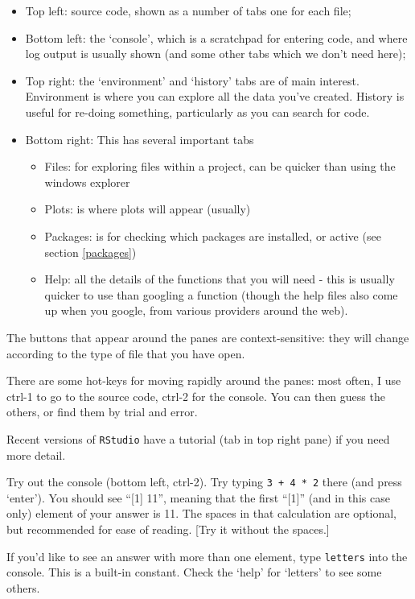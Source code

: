 \documentclass[
]{book}
\providecommand{\tightlist}{%
  \setlength{\itemsep}{0pt}\setlength{\parskip}{0pt}}
\begin{document}
\begin{itemize}
\tightlist
\item
  Top left: source code, shown as a number of tabs one for each file;
\item
  Bottom left: the `console', which is a scratchpad for entering code, and where log output is usually shown (and some other tabs which we don't need here);
\item
  Top right: the `environment' and `history' tabs are of main interest. Environment is where you can explore all the data you've created. History is useful for re-doing something, particularly as you can search for code.
\item
  Bottom right: This has several important tabs

  \begin{itemize}
  \tightlist
  \item
    Files: for exploring files within a project, can be quicker than using the windows explorer
  \item
    Plots: is where plots will appear (usually)
  \item
    Packages: is for checking which packages are installed, or active (see section \ref{packages})
  \item
    Help: all the details of the functions that you will need - this is usually quicker to use than googling a function (though the help files also come up when you google, from various providers around the web).
  \end{itemize}
\end{itemize}

The buttons that appear around the panes are context-sensitive: they will change according to the type of file that you have open.

There are some hot-keys for moving rapidly around the panes: most often, I use ctrl-1 to go to the source code, ctrl-2 for the console. You can then guess the others, or find them by trial and error.

Recent versions of \texttt{RStudio} have a tutorial (tab in top right pane) if you need more detail.

Try out the console (bottom left, ctrl-2). Try typing \texttt{3\ +\ 4\ *\ 2} there (and press `enter'). You should see ``{[}1{]} 11'', meaning that the first ``{[}1{]}'' (and in this case only) element of your answer is 11. The spaces in that calculation are optional, but recommended for ease of reading. {[}Try it without the spaces.{]}

If you'd like to see an answer with more than one element, type \texttt{letters} into the console. This is a built-in constant. Check the `help' for `letters' to see some others.
\end{document}
